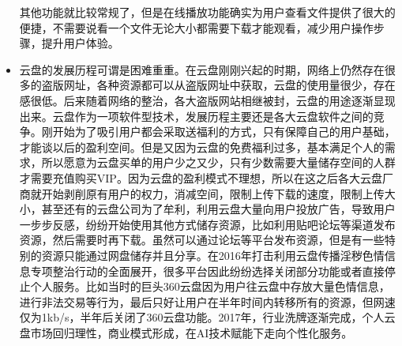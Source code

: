 \documentclass{article}
\begin{document}
\begin{itemize}
    其他功能就比较常规了，但是在线播放功能确实为用户查看文件提供了很大的便捷，不需要说看一个文件无论大小都需要下载才能观看，减少用户操作步骤，提升用户体验。
    \item 云盘的发展历程可谓是困难重重。在云盘刚刚兴起的时期，网络上仍然存在很多的盗版网址，各种资源都可以从盗版网址中获取，云盘的使用量很少，存在感很低。后来随着网络的整治，各大盗版网站相继被封，云盘的用途逐渐显现出来。云盘作为一项软件型技术，发展历程主要还是各大云盘软件之间的竞争。刚开始为了吸引用户都会采取送福利的方式，只有保障自己的用户基础，才能谈以后的盈利空间。但是又因为云盘的免费福利过多，基本满足个人的需求，所以愿意为云盘买单的用户少之又少，只有少数需要大量储存空间的人群才需要充值购买VIP。因为云盘的盈利模式不理想，所以在这之后各大云盘厂商就开始剥削原有用户的权力，消减空间，限制上传下载的速度，限制上传大小，甚至还有的云盘公司为了牟利，利用云盘大量向用户投放广告，导致用户一步步反感，纷纷开始使用其他方式储存资源，比如利用贴吧论坛等渠道发布资源，然后需要时再下载。虽然可以通过论坛等平台发布资源，但是有一些特别的资源只能通过网盘储存并且分享。在2016年打击利用云盘传播淫秽色情信息专项整治行动的全面展开，很多平台因此纷纷选择关闭部分功能或者直接停止个人服务。比如当时的巨头360云盘因为用户往云盘中存放大量色情信息，进行非法交易等行为，最后只好让用户在半年时间内转移所有的资源，但网速仅为1kb/s，半年后关闭了360云盘功能。2017年，行业洗牌逐渐完成，个人云盘市场回归理性，商业模式形成，在AI技术赋能下走向个性化服务。
    

\end{itemize}
\end{document}
